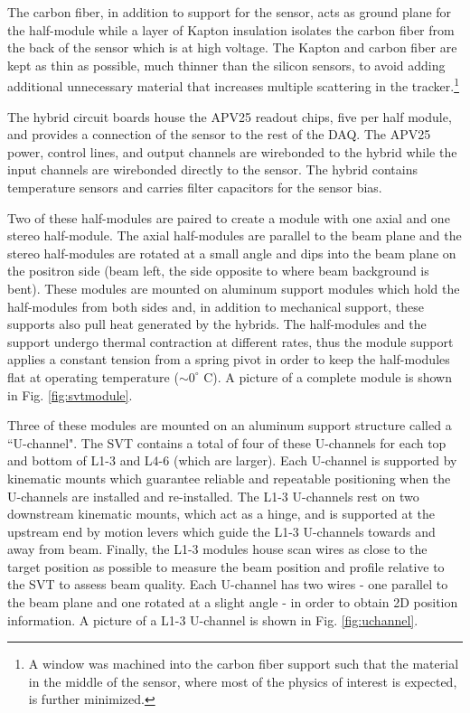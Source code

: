The carbon fiber, in addition to support for the sensor, acts as ground plane for the half-module while a layer of Kapton insulation isolates the carbon fiber from the back of the sensor which is at high voltage. The Kapton and carbon fiber are kept as thin as possible, much thinner than the silicon sensors, to avoid adding additional unnecessary material that increases multiple scattering in the tracker.\footnote{A window was machined into the carbon fiber support such that the material in the middle of the sensor, where most of the physics of interest is expected, is further minimized.}

The hybrid circuit boards house the APV25 readout chips, five per half module, and provides a connection of the sensor to the rest of the DAQ. The APV25 power, control lines, and output channels are wirebonded to the hybrid while the input channels are wirebonded directly to the sensor. The hybrid contains temperature sensors and carries filter capacitors for the sensor bias.

Two of these half-modules are paired to create a module with one axial and one stereo half-module. The axial half-modules are parallel to the beam plane and the stereo half-modules are rotated at a small angle and dips into the beam plane on the positron side (beam left, the side opposite to where beam background is bent). These modules are mounted on aluminum support modules which hold the half-modules from both sides and, in addition to mechanical support, these supports also pull heat generated by the hybrids. The half-modules and the support undergo thermal contraction at different rates, thus the module support applies a constant tension from a spring pivot in order to keep the half-modules flat at operating temperature ($\sim 0^{\circ}$ C). A picture of a complete module is shown in Fig. \ref{fig:svtmodule}.

Three of these modules are mounted on an aluminum support structure called a ``U-channel". The SVT contains a total of four of these U-channels for each top and bottom of L1-3 and L4-6 (which are larger). Each U-channel is supported by kinematic mounts which guarantee reliable and repeatable positioning when the U-channels are installed and re-installed. The L1-3 U-channels rest on two downstream kinematic mounts, which act as a hinge, and is supported at the upstream end by motion levers which guide the L1-3 U-channels towards and away from beam. Finally, the L1-3 modules house scan wires as close to the target position as possible to measure the beam position and profile relative to the SVT to assess beam quality. Each U-channel has two wires - one parallel to the beam plane and one rotated at a slight angle - in order to obtain 2D position information. A picture of a L1-3 U-channel is shown in Fig. \ref{fig:uchannel}.

